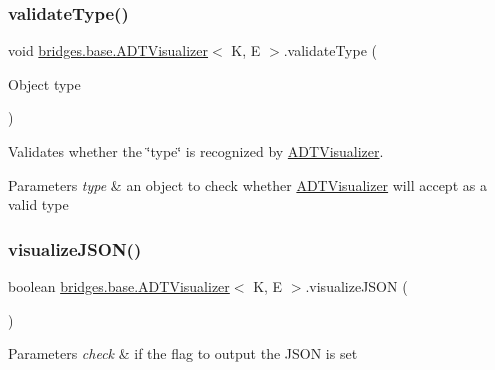 \hypertarget{classbridges_1_1base_1_1_a_d_t_visualizer_a991fc08ab102bc0f861e0aefe75282e7}{}\label{classbridges_1_1base_1_1_a_d_t_visualizer_a991fc08ab102bc0f861e0aefe75282e7} 
\subsubsection{\texorpdfstring{validate\+Type()}{validateType()}}
{\footnotesize\ttfamily void \hyperlink{classbridges_1_1base_1_1_a_d_t_visualizer}{bridges.\+base.\+A\+D\+T\+Visualizer}$<$ K, E $>$.validate\+Type (\begin{DoxyParamCaption}\item[{Object}]{type }\end{DoxyParamCaption})}

Validates whether the \char`\"{}type\char`\"{} is recognized by \hyperlink{classbridges_1_1base_1_1_a_d_t_visualizer}{A\+D\+T\+Visualizer}. 
\begin{DoxyParams}{Parameters}
{\em type} & an object to check whether \hyperlink{classbridges_1_1base_1_1_a_d_t_visualizer}{A\+D\+T\+Visualizer} will accept as a valid type \\
\hline
\end{DoxyParams}
\hypertarget{classbridges_1_1base_1_1_a_d_t_visualizer_a1aa47f3633239060197b523cb6b86e06}{}\label{classbridges_1_1base_1_1_a_d_t_visualizer_a1aa47f3633239060197b523cb6b86e06} 
\subsubsection{\texorpdfstring{visualize\+J\+S\+O\+N()}{visualizeJSON()}}
{\footnotesize\ttfamily boolean \hyperlink{classbridges_1_1base_1_1_a_d_t_visualizer}{bridges.\+base.\+A\+D\+T\+Visualizer}$<$ K, E $>$.visualize\+J\+S\+ON (\begin{DoxyParamCaption}{ }\end{DoxyParamCaption})}


\begin{DoxyParams}{Parameters}
{\em check} & if the flag to output the J\+S\+ON is set \\
\hline
\end{DoxyParams}


